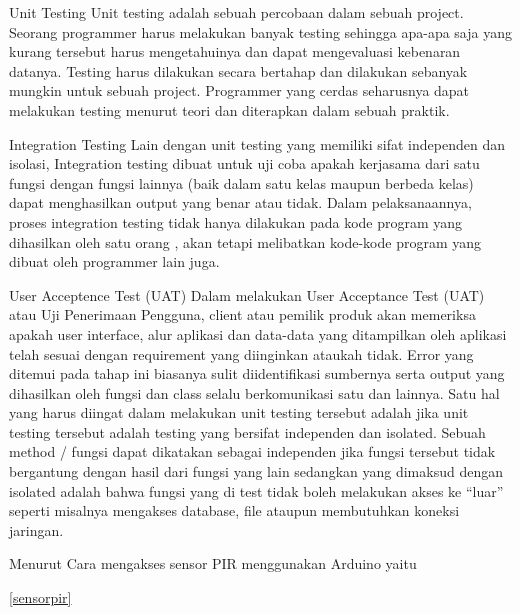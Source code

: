 \documentclass{article}
\begin{document}
Unit Testing
Unit testing adalah sebuah percobaan dalam sebuah project. Seorang programmer harus melakukan banyak testing sehingga apa-apa saja yang kurang tersebut harus mengetahuinya dan dapat mengevaluasi kebenaran datanya. Testing harus dilakukan secara bertahap dan dilakukan sebanyak mungkin untuk sebuah project. Programmer yang cerdas seharusnya dapat melakukan testing menurut teori dan diterapkan dalam sebuah praktik.
 
Integration Testing
Lain dengan unit testing yang memiliki sifat independen dan isolasi, Integration testing dibuat untuk uji coba apakah kerjasama dari satu fungsi dengan fungsi lainnya (baik dalam satu kelas maupun berbeda kelas) dapat menghasilkan output yang benar atau tidak. Dalam pelaksanaannya, proses integration testing tidak hanya dilakukan pada kode program yang dihasilkan oleh satu orang , akan tetapi melibatkan  kode-kode program yang dibuat oleh programmer lain juga.

User Acceptence Test (UAT)
Dalam melakukan User Acceptance Test (UAT) atau Uji Penerimaan Pengguna, client atau pemilik produk akan memeriksa apakah user interface, alur aplikasi dan data-data yang ditampilkan oleh aplikasi telah sesuai dengan requirement yang diinginkan ataukah tidak. Error yang ditemui pada tahap ini biasanya sulit diidentifikasi sumbernya serta output yang dihasilkan oleh fungsi dan class selalu berkomunikasi satu dan lainnya.
Satu hal yang harus diingat dalam melakukan unit testing tersebut adalah jika unit testing tersebut adalah testing yang bersifat independen dan isolated. Sebuah method / fungsi dapat dikatakan sebagai independen jika fungsi tersebut tidak bergantung dengan hasil dari fungsi yang lain sedangkan yang dimaksud dengan isolated adalah bahwa fungsi yang di test tidak boleh melakukan akses ke “luar” seperti misalnya mengakses database, file ataupun membutuhkan koneksi jaringan.


Menurut \cite{gifson2009sistem} Cara mengakses sensor PIR menggunakan Arduino yaitu

\ref{sensorpir}
\end{document}
